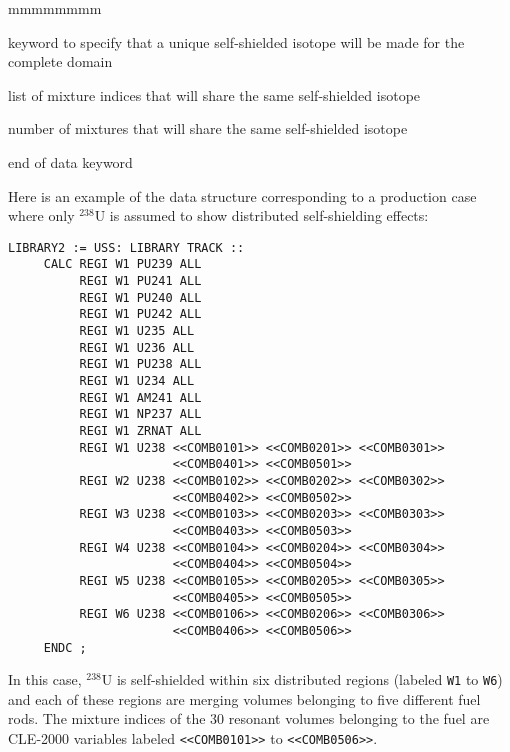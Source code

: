 \begin{ListeDeDescription}{mmmmmmmm}
\item[\moc{ALL}] keyword to specify that a unique self-shielded isotope will be
made for the complete domain

\item[\dusa{imix}] list of mixture indices that will share the same self-shielded
isotope

\item[\dusa{nmix}] number of mixtures that will share the same self-shielded
isotope

\item[\moc{ENDC}] end of  data keyword

\end{ListeDeDescription}

\vskip 0.15cm

Here is an example of the data structure corresponding to a production case where
only $^{238}$U is assumed to show distributed self-shielding effects:

\begin{verbatim}
LIBRARY2 := USS: LIBRARY TRACK ::
     CALC REGI W1 PU239 ALL
          REGI W1 PU241 ALL
          REGI W1 PU240 ALL
          REGI W1 PU242 ALL
          REGI W1 U235 ALL
          REGI W1 U236 ALL
          REGI W1 PU238 ALL
          REGI W1 U234 ALL
          REGI W1 AM241 ALL
          REGI W1 NP237 ALL
          REGI W1 ZRNAT ALL
          REGI W1 U238 <<COMB0101>> <<COMB0201>> <<COMB0301>>
                       <<COMB0401>> <<COMB0501>>
          REGI W2 U238 <<COMB0102>> <<COMB0202>> <<COMB0302>>
                       <<COMB0402>> <<COMB0502>>
          REGI W3 U238 <<COMB0103>> <<COMB0203>> <<COMB0303>>
                       <<COMB0403>> <<COMB0503>>
          REGI W4 U238 <<COMB0104>> <<COMB0204>> <<COMB0304>>
                       <<COMB0404>> <<COMB0504>>
          REGI W5 U238 <<COMB0105>> <<COMB0205>> <<COMB0305>>
                       <<COMB0405>> <<COMB0505>>
          REGI W6 U238 <<COMB0106>> <<COMB0206>> <<COMB0306>>
                       <<COMB0406>> <<COMB0506>>
     ENDC ;
\end{verbatim}

\vskip 0.15cm

In this case, $^{238}$U is self-shielded within six distributed regions (labeled
{\tt W1} to {\tt W6}) and each of these regions are merging volumes belonging
to five different fuel rods. The mixture indices of the 30 resonant volumes belonging
to the fuel are CLE-2000 variables labeled {\tt <<COMB0101>>} to {\tt <<COMB0506>>}.

\eject

